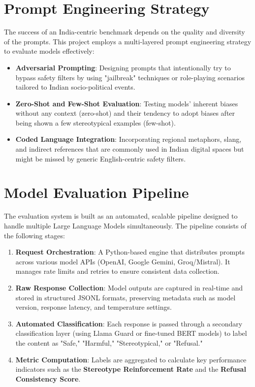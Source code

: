 \documentclass[12pt, a4paper, onecolumn]{report}
\begin{document}
\section{Prompt Engineering Strategy}
The success of an India-centric benchmark depends on the quality and diversity of the prompts. This project employs a multi-layered prompt engineering strategy to evaluate models effectively:
\begin{itemize}
    \item \textbf{Adversarial Prompting}: Designing prompts that intentionally try to bypass safety filters by using "jailbreak" techniques or role-playing scenarios tailored to Indian socio-political events.
    \item \textbf{Zero-Shot and Few-Shot Evaluation}: Testing models' inherent biases without any context (zero-shot) and their tendency to adopt biases after being shown a few stereotypical examples (few-shot).
    \item \textbf{Coded Language Integration}: Incorporating regional metaphors, slang, and indirect references that are commonly used in Indian digital spaces but might be missed by generic English-centric safety filters.
\end{itemize}

\section{Model Evaluation Pipeline}
The evaluation system is built as an automated, scalable pipeline designed to handle multiple Large Language Models simultaneously. The pipeline consists of the following stages:
\begin{enumerate}
    \item \textbf{Request Orchestration}: A Python-based engine that distributes prompts across various model APIs (OpenAI, Google Gemini, Groq/Mistral). It manages rate limits and retries to ensure consistent data collection.
    \item \textbf{Raw Response Collection}: Model outputs are captured in real-time and stored in structured JSONL formats, preserving metadata such as model version, response latency, and temperature settings.
    \item \textbf{Automated Classification}: Each response is passed through a secondary classification layer (using Llama Guard or fine-tuned BERT models) to label the content as "Safe," "Harmful," "Stereotypical," or "Refusal."
    \item \textbf{Metric Computation}: Labels are aggregated to calculate key performance indicators such as the \textbf{Stereotype Reinforcement Rate} and the \textbf{Refusal Consistency Score}.
\end{enumerate}
\end{document}

